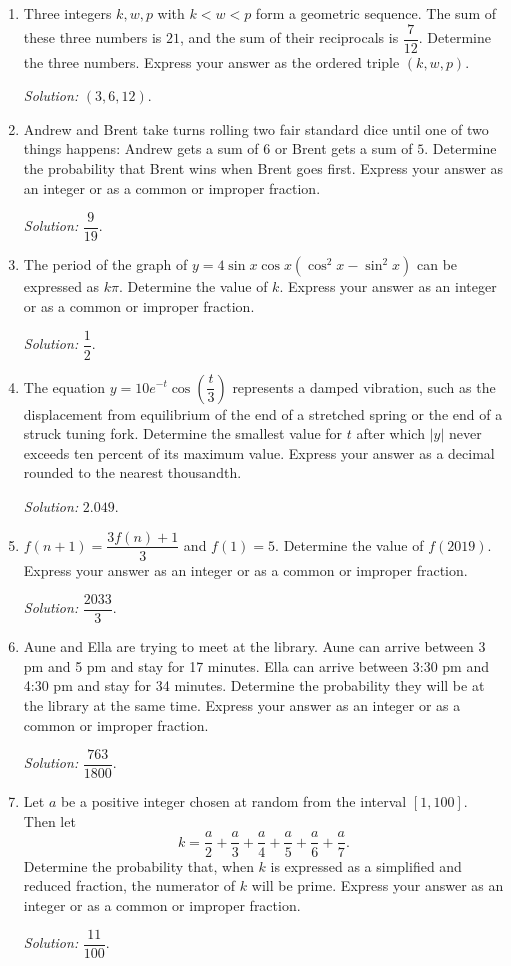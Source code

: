 \documentclass[11pt]{article}
\begin{document}
\begin{enumerate}[label=\textbf{\arabic*.}]
\item Three integers $k,w,p$ with $k<w<p$ form a geometric sequence. The sum of these three numbers is $21$, and the sum of their reciprocals is $\dfrac{7}{12}$. Determine the three numbers. Express your answer as the ordered triple $(k,w,p)$.\par\textit{Solution: }$(3,6,12)$.

\item Andrew and Brent take turns rolling two fair standard dice until one of two things happens: Andrew gets a sum of $6$ or Brent gets a sum of $5$. Determine the probability that Brent wins when Brent goes first. Express your answer as an integer or as a common or improper fraction.\par\textit{Solution: }$\dfrac{9}{19}$.

\item The period of the graph of $y=4\sin x\cos x(\cos^2x-\sin^2x)$ can be expressed as $k\pi$. Determine the value of $k$. Express your answer as an integer or as a common or improper fraction.\par\textit{Solution: }$\dfrac{1}{2}$.

\item The equation $y=10e^{-t}\cos\left(\dfrac{t}{3}\right)$ represents a damped vibration, such as the displacement from equilibrium of the end of a stretched spring or the end of a struck tuning fork. Determine the smallest value for $t$ after which $|y|$ never exceeds ten percent of its maximum value. Express your answer as a decimal rounded to the nearest thousandth.\par\textit{Solution: }$2.049$.

\item $f(n+1)=\dfrac{3f(n)+1}{3}$ and $f(1)=5$. Determine the value of $f(2019)$. Express your answer as an integer or as a common or improper fraction.\par\textit{Solution: }$\dfrac{2033}{3}$.

\item Aune and Ella are trying to meet at the library. Aune can arrive between 3 pm and 5 pm and stay for 17 minutes. Ella can arrive between 3:30 pm and 4:30 pm and stay for 34 minutes. Determine the probability they will be at the library at the same time. Express your answer as an integer or as a common or improper fraction.\par\textit{Solution: }$\dfrac{763}{1800}$.

\item Let $a$ be a positive integer chosen at random from the interval $[1,100]$. Then let
\[
k=\frac{a}{2}+\frac{a}{3}+\frac{a}{4}+\frac{a}{5}+\frac{a}{6}+\frac{a}{7}.
\]
Determine the probability that, when $k$ is expressed as a simplified and reduced fraction, the numerator of $k$ will be prime. Express your answer as an integer or as a common or improper fraction.\par\textit{Solution: }$\dfrac{11}{100}$.


\end{enumerate}
\end{document}
